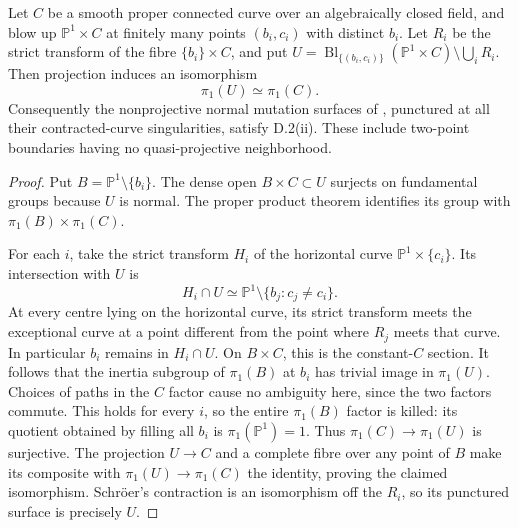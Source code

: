 \begin{proposition}
\label{D:mutation-surfaces}
Let $C$ be a smooth proper connected curve over an algebraically
closed field, and blow up $\mathbb P^1\times C$ at finitely many
points $(b_i,c_i)$ with distinct $b_i$. Let $R_i$ be the strict
transform of the fibre $\{b_i\}\times C$, and put
$U=\operatorname{Bl}_{\{(b_i,c_i)\}}(\mathbb P^1\times C)
\setminus\bigcup_iR_i$. Then projection induces an isomorphism
\[
 \pi_1(U)\simeq\pi_1(C).
\]
Consequently the nonprojective normal mutation surfaces of
\cite[sections 2.2--2.5, author's PDF pp.~3--4]{Schroer1999D},
punctured at all their contracted-curve singularities, satisfy D.2(ii).
These include two-point boundaries having no quasi-projective
neighborhood.
\end{proposition}
\begin{proof}
Put $B=\mathbb P^1\setminus\{b_i\}$. The dense open
$B\times C\subset U$ surjects on fundamental groups because $U$
is normal. The proper product theorem
\cite[X, Corollary 1.7, pp.~264--265]{SGA1} identifies its group
with $\pi_1(B)\times\pi_1(C)$.

For each $i$, take the strict transform $H_i$ of the horizontal
curve $\mathbb P^1\times\{c_i\}$. Its intersection with $U$ is
\[
 H_i\cap U\simeq
 \mathbb P^1\setminus\{b_j:c_j\ne c_i\}.
\]
At every centre lying on the horizontal curve, its strict transform
meets the exceptional curve at a point different from the point
where $R_j$ meets that curve. In particular $b_i$ remains in
$H_i\cap U$. On $B\times C$, this is the constant-$C$ section.
It follows that the inertia subgroup of $\pi_1(B)$ at $b_i$ has
trivial image in $\pi_1(U)$. Choices of paths in the $C$ factor
cause no ambiguity here, since the two factors commute. This holds
for every $i$, so the entire $\pi_1(B)$ factor is killed: its
quotient obtained by filling all $b_i$ is $\pi_1(\mathbb P^1)=1$.
Thus $\pi_1(C)\to\pi_1(U)$ is surjective. The projection $U\to C$
and a complete fibre over any point of $B$ make its composite with
$\pi_1(U)\to\pi_1(C)$ the identity, proving the claimed isomorphism.
Schr\"oer's contraction is an isomorphism off the $R_i$, so its
punctured surface is precisely $U$.
\end{proof}

